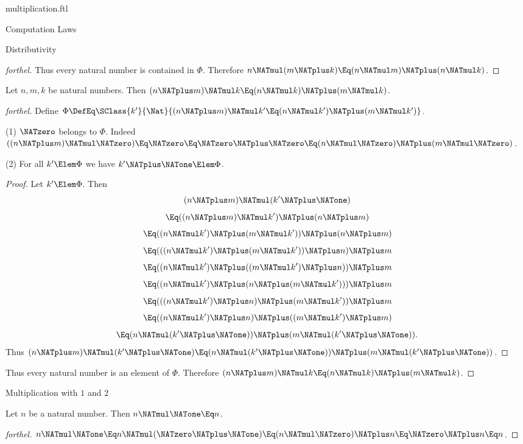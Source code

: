 \documentclass{stex}
\begin{document}
\begin{smodule}{multiplication.ftl}
\begin{sfragment}{Computation Laws}
\begin{sfragment}{Distributivity}
\begin{proof}[forthel]
      Thus every natural number is contained in $\Phi$.
      Therefore $n \NATmul (m \NATplus k) \Eq (n \NATmul m) \NATplus (n \NATmul k)$.
    \end{proof}

    \begin{proposition}[forthel]
      Let $n, m, k$ be natural numbers.
      Then $(n \NATplus m) \NATmul k \Eq (n \NATmul k) \NATplus (m \NATmul k)$.
    \end{proposition}
    \begin{proof}[forthel]
      Define $\Phi \DefEq \SClass{k'}{\Nat}{(n \NATplus m) \NATmul k' \Eq (n \NATmul k') \NATplus (m \NATmul k')}$.

      (1) $\NATzero$ belongs to $\Phi$.
      Indeed $((n \NATplus m) \NATmul \NATzero)
        \Eq \NATzero
        \Eq \NATzero \NATplus \NATzero
        \Eq (n \NATmul \NATzero) \NATplus (m \NATmul \NATzero)$.

      (2) For all $k' \Elem \Phi$ we have $k' \NATplus \NATone \Elem \Phi$.
      \begin{proof}
        Let $k' \Elem \Phi$.
        Then
        \[  (n \NATplus m) \NATmul (k' \NATplus \NATone)                        \]
        \[    \Eq ((n \NATplus m) \NATmul k') \NATplus (n \NATplus m)              \]
        \[    \Eq ((n \NATmul k') \NATplus (m \NATmul k')) \NATplus (n \NATplus m)   \]
        \[    \Eq (((n \NATmul k') \NATplus (m \NATmul k')) \NATplus n) \NATplus m   \]
        \[    \Eq ((n \NATmul k') \NATplus ((m \NATmul k') \NATplus n)) \NATplus m   \]
        \[    \Eq ((n \NATmul k') \NATplus (n \NATplus (m \NATmul k'))) \NATplus m   \]
        \[    \Eq (((n \NATmul k') \NATplus n) \NATplus (m \NATmul k')) \NATplus m   \]
        \[    \Eq ((n \NATmul k') \NATplus n) \NATplus ((m \NATmul k') \NATplus m)   \]
        \[    \Eq (n \NATmul (k' \NATplus \NATone)) \NATplus (m \NATmul (k' \NATplus \NATone)).  \]
        Thus $(n \NATplus m) \NATmul (k' \NATplus \NATone) \Eq (n \NATmul (k' \NATplus \NATone)) \NATplus (m \NATmul (k' \NATplus \NATone))$.
      \end{proof}

      Thus every natural number is an element of $\Phi$.
      Therefore $(n \NATplus m) \NATmul k \Eq (n \NATmul k) \NATplus (m \NATmul k)$.
    \end{proof}
  \end{sfragment}

  \begin{sfragment}{Multiplication with $1$ and $2$}
    \begin{proposition}[forthel]
      Let $n$ be a natural number.
      Then $n \NATmul \NATone \Eq n$.
    \end{proposition}
    \begin{proof}[forthel]
      $n \NATmul \NATone
        \Eq n \NATmul (\NATzero \NATplus \NATone)
        \Eq (n \NATmul \NATzero) \NATplus n
        \Eq \NATzero \NATplus n
        \Eq n$.
    \end{proof}


\end{sfragment}
\end{sfragment}
\end{smodule}
\end{document}
